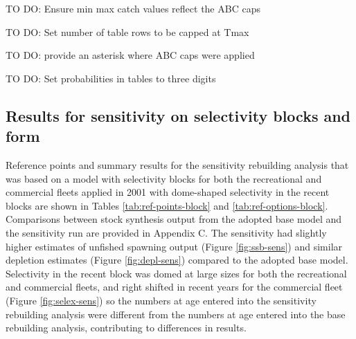 \documentclass[11pt,
  english,
  a4paper,
]{article}
\begin{document}
TO DO: Ensure min max catch values reflect the ABC caps

\leavevmode\tagmcend\tagstructend\par


TO DO: Set number of table rows to be capped at Tmax

\leavevmode\tagmcend\tagstructend\par


TO DO: provide an asterisk where ABC caps were applied

\leavevmode\tagmcend\tagstructend\par


TO DO: Set probabilities in tables to three digits

\leavevmode\tagmcend\tagstructend\par


\hypertarget{results-for-sensitivity-on-selectivity-blocks-and-form}{%
\subsection{Results for sensitivity on selectivity blocks and form}\label{results-for-sensitivity-on-selectivity-blocks-and-form}}

\leavevmode\tagmcend\tagstructend


Reference points and summary results for the sensitivity rebuilding analysis that was based on a model with selectivity blocks for both the recreational and commercial fleets applied in 2001 with dome-shaped selectivity in the recent blocks are shown in Tables \ref{tab:ref-points-block} and \ref{tab:ref-options-block}. Comparisons between stock synthesis output from the adopted base model and the sensitivity run are provided in \protect\hypertarget{append_c}{}{Appendix C}. The sensitivity had slightly higher estimates of unfished spawning output (Figure \ref{fig:ssb-sens}) and similar depletion estimates (Figure \ref{fig:depl-sens}) compared to the adopted base model. Selectivity in the recent block was domed at large sizes for both the recreational and commercial fleets, and right shifted in recent years for the commercial fleet (Figure \ref{fig:selex-sens}) so the numbers at age entered into the sensitivity rebuilding analysis were different from the numbers at age entered into the base rebuilding analysis, contributing to differences in results.
\end{document}
